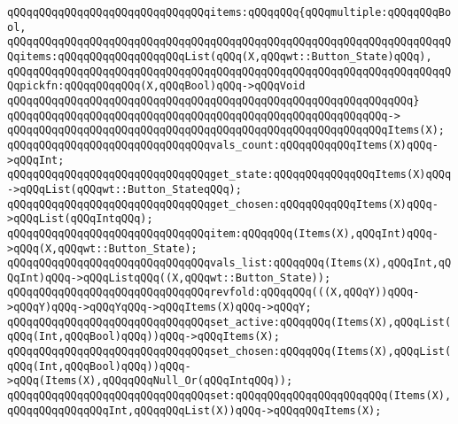 \verb|qQQqqQQqqQQqqQQqqQQqqQQqqQQqqQQqitems:qQQqqQQq{qQQqmultiple:qQQqqQQqBool,|\newline
\verb|qQQqqQQqqQQqqQQqqQQqqQQqqQQqqQQqqQQqqQQqqQQqqQQqqQQqqQQqqQQqqQQqqQQqqQQqitems:qQQqqQQqqQQqqQQqqQQqList(qQQq(X,qQQqwt::Button_State)qQQq),|\newline
\verb|qQQqqQQqqQQqqQQqqQQqqQQqqQQqqQQqqQQqqQQqqQQqqQQqqQQqqQQqqQQqqQQqqQQqqQQqpickfn:qQQqqQQqqQQq(X,qQQqBool)qQQq->qQQqVoid|\newline
\verb|qQQqqQQqqQQqqQQqqQQqqQQqqQQqqQQqqQQqqQQqqQQqqQQqqQQqqQQqqQQqqQQq}|\newline
\verb|qQQqqQQqqQQqqQQqqQQqqQQqqQQqqQQqqQQqqQQqqQQqqQQqqQQqqQQqqQQq->|\newline
\verb|qQQqqQQqqQQqqQQqqQQqqQQqqQQqqQQqqQQqqQQqqQQqqQQqqQQqqQQqqQQqItems(X);|\newline
\newline
\verb|qQQqqQQqqQQqqQQqqQQqqQQqqQQqqQQqvals_count:qQQqqQQqqQQqItems(X)qQQq->qQQqInt;|\newline
\verb|qQQqqQQqqQQqqQQqqQQqqQQqqQQqqQQqget_state:qQQqqQQqqQQqqQQqItems(X)qQQq->qQQqList(qQQqwt::Button_StateqQQq);|\newline
\verb|qQQqqQQqqQQqqQQqqQQqqQQqqQQqqQQqget_chosen:qQQqqQQqqQQqItems(X)qQQq->qQQqList(qQQqIntqQQq);|\newline
\newline
\verb|qQQqqQQqqQQqqQQqqQQqqQQqqQQqqQQqitem:qQQqqQQq(Items(X),qQQqInt)qQQq->qQQq(X,qQQqwt::Button_State);|\newline
\newline
\verb|qQQqqQQqqQQqqQQqqQQqqQQqqQQqqQQqvals_list:qQQqqQQq(Items(X),qQQqInt,qQQqInt)qQQq->qQQqListqQQq((X,qQQqwt::Button_State));|\newline
\newline
\verb|qQQqqQQqqQQqqQQqqQQqqQQqqQQqqQQqrevfold:qQQqqQQq(((X,qQQqY))qQQq->qQQqY)qQQq->qQQqYqQQq->qQQqItems(X)qQQq->qQQqY;|\newline
\newline
\verb|qQQqqQQqqQQqqQQqqQQqqQQqqQQqqQQqset_active:qQQqqQQq(Items(X),qQQqList(qQQq(Int,qQQqBool)qQQq))qQQq->qQQqItems(X);|\newline
\verb|qQQqqQQqqQQqqQQqqQQqqQQqqQQqqQQqset_chosen:qQQqqQQq(Items(X),qQQqList(qQQq(Int,qQQqBool)qQQq))qQQq->qQQq(Items(X),qQQqqQQqNull_Or(qQQqIntqQQq));|\newline
\verb|qQQqqQQqqQQqqQQqqQQqqQQqqQQqqQQqset:qQQqqQQqqQQqqQQqqQQqqQQq(Items(X),qQQqqQQqqQQqqQQqInt,qQQqqQQqList(X))qQQq->qQQqqQQqItems(X);|\newline
